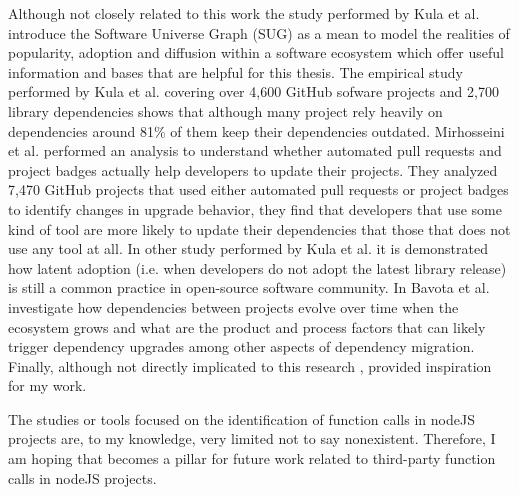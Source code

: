 Although not closely related to this work the study performed by Kula et al. \cite{kula2018generalized} introduce the Software Universe Graph (SUG) as a mean to model the realities of popularity, adoption and diffusion within a software ecosystem which offer useful information and bases that are helpful for this thesis. The empirical study performed by Kula et al. \cite{Kula:2018} covering over 4,600 GitHub sofware projects and 2,700 library dependencies shows that although many project rely heavily on dependencies around 81\% of them keep their dependencies outdated. Mirhosseini et al. \cite{Mirhosseini:2017} performed an analysis to understand whether automated pull requests and project badges actually help developers to update their projects. They analyzed 7,470 GitHub projects that used either automated pull requests or project badges to identify changes in upgrade behavior, they find that developers that use some kind of tool are more likely to update their dependencies that those that does not use any tool at all. In other study performed by Kula et al. \cite{Kula:2015} it is demonstrated how latent adoption (i.e. when developers do not adopt the latest library release) is still a common practice in open-source software community. In \cite{bavota2015apache} Bavota et al. investigate how dependencies between projects evolve over time when the ecosystem grows and what are the product and process factors that can likely trigger dependency upgrades among other aspects of dependency migration.
Finally, although not directly implicated to this research \cite{plate2015impact,landman2017challenges,alqahtani2016tracing,cadariu2015tracking,xia2014studying,ruiz2015beyond,ishio2016software,decan2017empirical}, provided inspiration for my work.

The studies or tools focused on the identification of function calls in nodeJS projects are, to my knowledge, very limited not to say nonexistent. Therefore, I am hoping that \tool[] becomes a pillar for future work related to third-party function calls in nodeJS projects.
